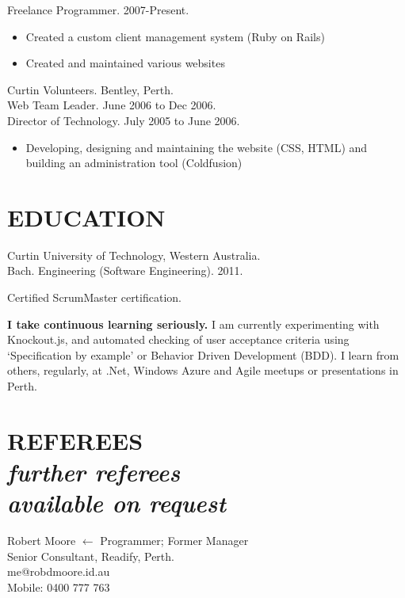 \documentclass[margin]{res}
\begin{document}
\begin{resume}
  Freelance Programmer. 2007-Present.
  \begin{itemize}
    \item Created a custom client management system (Ruby on Rails)
    \item Created and maintained various websites
  \end{itemize} 
  
  Curtin Volunteers. Bentley, Perth. \\
  Web Team Leader.  June 2006 to Dec 2006.\\
  Director of Technology.  July 2005 to June 2006.
  \begin{itemize}
    \item Developing, designing and maintaining the website (CSS, HTML) and building an administration tool (Coldfusion)
  \end{itemize} 


  \section{EDUCATION}
  Curtin University of Technology, Western Australia. \\
  Bach. Engineering (Software Engineering). 2011.

  Certified ScrumMaster certification.

  \textbf{I take continuous learning seriously.}
  I am currently experimenting with Knockout.js, and automated checking of user acceptance criteria using
  `Specification by example' or Behavior Driven Development (BDD).
  I learn from others, regularly, at .Net, Windows Azure and Agile meetups or presentations in Perth.

  \section{REFEREES\\
    \footnotesize\itshape
    \textmd{further referees\\
      available on request}
  }
  Robert Moore
  \hfill $\longleftarrow$ Programmer; Former Manager\\
  Senior Consultant, Readify, Perth. \\
  me@robdmoore.id.au \\
  Mobile: 0400 777 763

\end{resume} 
\end{document}
